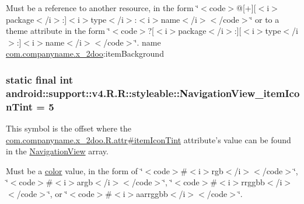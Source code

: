 Must be a reference to another resource, in the form \char`\"{}$<$code$>$@\mbox{[}+\mbox{]}\mbox{[}$<$i$>$package$<$/i$>$:\mbox{]}$<$i$>$type$<$/i$>$:$<$i$>$name$<$/i$>$$<$/code$>$\char`\"{} or to a theme attribute in the form \char`\"{}$<$code$>$?\mbox{[}$<$i$>$package$<$/i$>$:\mbox{]}\mbox{[}$<$i$>$type$<$/i$>$:\mbox{]}$<$i$>$name$<$/i$>$$<$/code$>$\char`\"{}.  name \hyperlink{namespacecom_1_1companyname_1_1x__2doo}{com.companyname.x\_\-2doo}:itemBackground \hypertarget{classandroid_1_1support_1_1v4_1_1_r_1_1styleable_98d85bc9f9bd29fcdd3e78ac5d8ccafd}{
\subsubsection[{NavigationView\_\-itemIconTint}]{\setlength{\rightskip}{0pt plus 5cm}static final int android::support::v4.R.R::styleable::NavigationView\_\-itemIconTint = 5}}
\label{classandroid_1_1support_1_1v4_1_1_r_1_1styleable_98d85bc9f9bd29fcdd3e78ac5d8ccafd}


This symbol is the offset where the \hyperlink{classcom_1_1companyname_1_1x__2doo_1_1_r_1_1attr_d180f97cceb2f27d8105134eeb91445f}{com.companyname.x\_\-2doo.R.attr\#itemIconTint} attribute's value can be found in the \hyperlink{classandroid_1_1support_1_1v4_1_1_r_1_1styleable_5278cd545a73a5a4af313995900ae2d8}{NavigationView} array.

Must be a \hyperlink{classandroid_1_1support_1_1v4_1_1_r_1_1color}{color} value, in the form of \char`\"{}$<$code$>$\#$<$i$>$rgb$<$/i$>$$<$/code$>$\char`\"{}, \char`\"{}$<$code$>$\#$<$i$>$argb$<$/i$>$$<$/code$>$\char`\"{}, \char`\"{}$<$code$>$\#$<$i$>$rrggbb$<$/i$>$$<$/code$>$\char`\"{}, or \char`\"{}$<$code$>$\#$<$i$>$aarrggbb$<$/i$>$$<$/code$>$\char`\"{}. 

